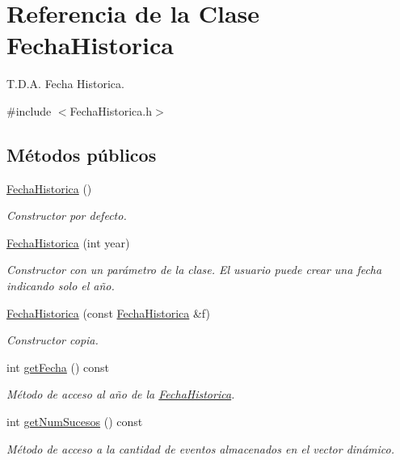 \hypertarget{classFechaHistorica}{}\section{Referencia de la Clase Fecha\+Historica}
\label{classFechaHistorica}


T.\+D.\+A. Fecha Historica.  




{\ttfamily \#include $<$Fecha\+Historica.\+h$>$}

\subsection*{Métodos públicos}
\begin{DoxyCompactItemize}
\item 
\hyperlink{classFechaHistorica_a35baa09e365240e567049a7e33a7c209}{Fecha\+Historica} ()
\begin{DoxyCompactList}\small\item\em Constructor por defecto. \end{DoxyCompactList}\item 
\hyperlink{classFechaHistorica_abf2f8b43afe7baae644fcc8315236eb4}{Fecha\+Historica} (int year)
\begin{DoxyCompactList}\small\item\em Constructor con un parámetro de la clase. El usuario puede crear una fecha indicando solo el año. \end{DoxyCompactList}\item 
\hyperlink{classFechaHistorica_a40a9c133a139d41bf84406e09022feaf}{Fecha\+Historica} (const \hyperlink{classFechaHistorica}{Fecha\+Historica} \&f)
\begin{DoxyCompactList}\small\item\em Constructor copia. \end{DoxyCompactList}\item 
int \hyperlink{classFechaHistorica_acf81e1528a9c7e813626873745cd55d7}{get\+Fecha} () const
\begin{DoxyCompactList}\small\item\em Método de acceso al año de la \hyperlink{classFechaHistorica}{Fecha\+Historica}. \end{DoxyCompactList}\item 
int \hyperlink{classFechaHistorica_aa63596d45eda999d9d65ea4eae22342f}{get\+Num\+Sucesos} () const
\begin{DoxyCompactList}\small\item\em Método de acceso a la cantidad de eventos almacenados en el vector dinámico. \end{DoxyCompactList}\item 

\end{DoxyCompactItemize}
